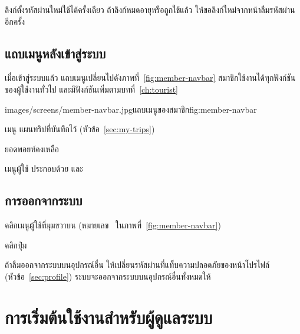 ลิงก์ตั้งรหัสผ่านใหม่ใช้ได้ครั้งเดียว ถ้าลิงก์หมดอายุหรือถูกใช้แล้ว ให้ขอลิงก์ใหม่จากหน้าลืมรหัสผ่านอีกครั้ง

\subsection{แถบเมนูหลังเข้าสู่ระบบ}
\label{sec:member-menu}

เมื่อเข้าสู่ระบบแล้ว แถบเมนูเปลี่ยนไปดังภาพที่~\ref{fig:member-navbar} สมาชิกใช้งานได้ทุกฟังก์ชันของผู้ใช้งานทั่วไป และมีฟังก์ชันเพิ่มตามบทที่~\ref{ch:tourist}

\begin{screenshot}{images/screens/member-navbar.jpg}{แถบเมนูของสมาชิก}{fig:member-navbar}
\end{screenshot}

\begin{calloutlist}
  \item เมนู  แผนทริปที่บันทึกไว้ (หัวข้อ~\ref{sec:my-trips})
  \item ยอดพอยท์คงเหลือ
  \item เมนูผู้ใช้ ประกอบด้วย      และ 
\end{calloutlist}

\subsection{การออกจากระบบ}
\label{sec:logout}

\begin{steps}
  \item คลิกเมนูผู้ใช้ที่มุมขวาบน (หมายเลข~ ในภาพที่~\ref{fig:member-navbar})
  \item คลิกปุ่ม 
\end{steps}

\begin{tip}
ถ้าลืมออกจากระบบบนอุปกรณ์อื่น ให้เปลี่ยนรหัสผ่านที่แท็บความปลอดภัยของหน้าโปรไฟล์ (หัวข้อ~\ref{sec:profile}) ระบบจะออกจากระบบบนอุปกรณ์อื่นทั้งหมดให้
\end{tip}

\clearpage
\section{การเริ่มต้นใช้งานสำหรับผู้ดูแลระบบ}
\label{sec:start-admin}

